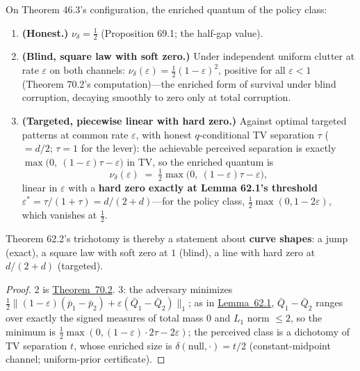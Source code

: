 \begin{thmplain}

On Theorem 46.3's configuration, the enriched quantum of the policy class:

\begin{enumerate}
\def\labelenumi{\arabic{enumi}.}
\tightlist
\item
  \textbf{(Honest.)} \(\nu_\delta = \tfrac12\) (Proposition 69.1; the half-gap value).
\item
  \textbf{(Blind, square law with soft zero.)} Under independent uniform clutter at rate \(\varepsilon\) on both channels: \(\nu_\delta(\varepsilon) = \tfrac12(1 - \varepsilon)^2\), positive for all \(\varepsilon < 1\) (Theorem 70.2's computation)---\hspace{0pt}the enriched form of survival under blind corruption, decaying smoothly to zero only at total corruption.
\item
  \textbf{(Targeted, piecewise linear with hard zero.)} Against optimal targeted patterns at common rate \(\varepsilon\), with honest \(q\)-conditional TV separation \(\tau\) (\(= d/2\); \(\tau = 1\) for the lever): the achievable perceived separation is exactly \(\max\big(0,\ (1-\varepsilon)\tau - \varepsilon\big)\) in TV, so the enriched quantum is
  \[
  \nu_\delta(\varepsilon) \;=\; \tfrac12 \max\big(0,\ (1-\varepsilon)\tau - \varepsilon\big),
  \]
  linear in \(\varepsilon\) with a \textbf{hard zero exactly at Lemma 62.1's threshold} \(\varepsilon^* = \tau/(1+\tau) = d/(2+d)\)---\hspace{0pt}for the policy class, \(\tfrac12\max(0, 1 - 2\varepsilon)\), which vanishes at \(\tfrac12\).
\end{enumerate}

Theorem 62.2's trichotomy is thereby a statement about \textbf{curve shapes}: a jump (exact), a square law with soft zero at \(1\) (blind), a line with hard zero at \(d/(2+d)\) (targeted).
\end{thmplain}

\begin{proof}

2 is \hyperlink{stmt:70.2}{Theorem~70.2}. 3: the adversary minimizes \(\tfrac12\lVert (1-\varepsilon)(\bar p_1 - \bar p_2) + \varepsilon(\bar Q_1 - \bar Q_2)\rVert_1\); as in \hyperlink{stmt:62.1}{Lemma~62.1}, \(\bar Q_1 - \bar Q_2\) ranges over exactly the signed measures of total mass \(0\) and \(L_1\) norm \(\le 2\), so the minimum is \(\tfrac12\max(0, (1-\varepsilon)\cdot 2\tau - 2\varepsilon)\); the perceived class is a dichotomy of TV separation \(t\), whose enriched size is \(\delta(\text{null}, \cdot) = t/2\) (constant-midpoint channel; uniform-prior certificate).
\end{proof}

